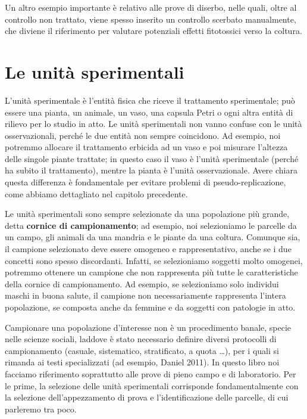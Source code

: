 \documentclass[
  12pt,
]{book}
\begin{document}
Un altro esempio importante è relativo alle prove di diserbo, nelle quali, oltre al controllo non trattato, viene spesso inserito un controllo scerbato manualmente, che diviene il riferimento per valutare potenziali effetti fitotossici verso la coltura.

\hypertarget{le-unituxe0-sperimentali}{%
\section{Le unità sperimentali}\label{le-unituxe0-sperimentali}}

L'unità sperimentale è l'entità fisica che riceve il trattamento sperimentale; può essere una pianta, un animale, un vaso, una capsula Petri o ogni altra entità di rilievo per lo studio in atto. Le unità sperimentali non vanno confuse con le unità osservazionali, perché le due entità non sempre coincidono. Ad esempio, noi potremmo allocare il trattamento erbicida ad un vaso e poi misurare l'altezza delle singole piante trattate; in questo caso il vaso è l'unità sperimentale (perché ha subito il trattamento), mentre la pianta è l'unità osservazionale. Avere chiara questa differenza è fondamentale per evitare problemi di pseudo-replicazione, come abbiamo dettagliato nel capitolo precedente.

Le unità sperimentali sono sempre selezionate da una popolazione più grande, detta \textbf{cornice di campionamento}; ad esempio, noi selezioniamo le parcelle da un campo, gli animali da una mandria e le piante da una coltura. Comunque sia, il campione selezionato deve essere omogeneo e rappresentativo, anche se i due concetti sono spesso discordanti. Infatti, se selezioniamo soggetti molto omogenei, potremmo ottenere un campione che non rappresenta più tutte le caratteristiche della cornice di campionamento. Ad esempio, se selezioniamo solo individui maschi in buona salute, il campione non necessariamente rappresenta l'intera popolazione, se composta anche da femmine e da soggetti con patologie in atto.

Campionare una popolazione d'interesse non è un procedimento banale, specie nelle scienze sociali, laddove è stato necessario definire diversi protocolli di campionamento (casuale, sistematico, stratificato, a quota \ldots), per i quali si rimanda ai testi specializzati (ad esempio, Daniel 2011). In questo libro noi facciamo riferimento soprattutto alle prove di pieno campo e di laboratorio. Per le prime, la selezione delle unità sperimentali corrisponde fondamentalmente con la selezione dell'appezzamento di prova e l'identificazione delle parcelle, di cui parleremo tra poco.
\end{document}
